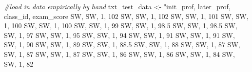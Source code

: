 \documentclass[
]{book}
\newenvironment{Shaded}{\begin{snugshade}}{\end{snugshade}}
\newcommand{\CommentTok}[1]{\textcolor[rgb]{0.56,0.35,0.01}{\textit{#1}}}
\newcommand{\NormalTok}[1]{#1}
\newcommand{\StringTok}[1]{\textcolor[rgb]{0.31,0.60,0.02}{#1}}
\begin{document}
\begin{Shaded}
\begin{Highlighting}[]
\CommentTok{\#load in data empirically by hand}
\NormalTok{txt\_test\_data \textless{}{-}}\StringTok{ "init\_prof, later\_prof, class\_id, exam\_score}
\StringTok{ \textquotesingle{}SW\textquotesingle{}, \textquotesingle{}SW\textquotesingle{}, 1, 102}
\StringTok{ \textquotesingle{}SW\textquotesingle{}, \textquotesingle{}SW\textquotesingle{}, 1, 102}
\StringTok{ \textquotesingle{}SW\textquotesingle{}, \textquotesingle{}SW\textquotesingle{}, 1, 101}
\StringTok{ \textquotesingle{}SW\textquotesingle{}, \textquotesingle{}SW\textquotesingle{}, 1, 100}
\StringTok{ \textquotesingle{}SW\textquotesingle{}, \textquotesingle{}SW\textquotesingle{}, 1, 100}
\StringTok{ \textquotesingle{}SW\textquotesingle{}, \textquotesingle{}SW\textquotesingle{}, 1, 99}
\StringTok{ \textquotesingle{}SW\textquotesingle{}, \textquotesingle{}SW\textquotesingle{}, 1, 98.5}
\StringTok{ \textquotesingle{}SW\textquotesingle{}, \textquotesingle{}SW\textquotesingle{}, 1, 98.5}
\StringTok{ \textquotesingle{}SW\textquotesingle{}, \textquotesingle{}SW\textquotesingle{}, 1, 97}
\StringTok{ \textquotesingle{}SW\textquotesingle{}, \textquotesingle{}SW\textquotesingle{}, 1, 95}
\StringTok{ \textquotesingle{}SW\textquotesingle{}, \textquotesingle{}SW\textquotesingle{}, 1, 94}
\StringTok{ \textquotesingle{}SW\textquotesingle{}, \textquotesingle{}SW\textquotesingle{}, 1, 91}
\StringTok{ \textquotesingle{}SW\textquotesingle{}, \textquotesingle{}SW\textquotesingle{}, 1, 91}
\StringTok{ \textquotesingle{}SW\textquotesingle{}, \textquotesingle{}SW\textquotesingle{}, 1, 90}
\StringTok{ \textquotesingle{}SW\textquotesingle{}, \textquotesingle{}SW\textquotesingle{}, 1, 89}
\StringTok{ \textquotesingle{}SW\textquotesingle{}, \textquotesingle{}SW\textquotesingle{}, 1, 88.5}
\StringTok{ \textquotesingle{}SW\textquotesingle{}, \textquotesingle{}SW\textquotesingle{}, 1, 88}
\StringTok{ \textquotesingle{}SW\textquotesingle{}, \textquotesingle{}SW\textquotesingle{}, 1, 87}
\StringTok{ \textquotesingle{}SW\textquotesingle{}, \textquotesingle{}SW\textquotesingle{}, 1, 87}
\StringTok{ \textquotesingle{}SW\textquotesingle{}, \textquotesingle{}SW\textquotesingle{}, 1, 87}
\StringTok{ \textquotesingle{}SW\textquotesingle{}, \textquotesingle{}SW\textquotesingle{}, 1, 86}
\StringTok{ \textquotesingle{}SW\textquotesingle{}, \textquotesingle{}SW\textquotesingle{}, 1, 86}
\StringTok{ \textquotesingle{}SW\textquotesingle{}, \textquotesingle{}SW\textquotesingle{}, 1, 84}
\StringTok{ \textquotesingle{}SW\textquotesingle{}, \textquotesingle{}SW\textquotesingle{}, 1, 82}

\end{Highlighting}
\end{Shaded}
\end{document}
